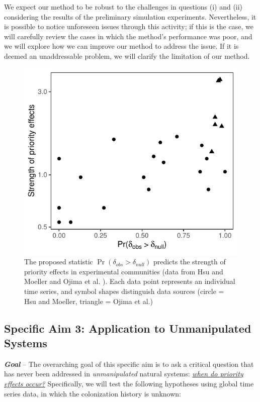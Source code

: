 \documentclass[12pt, class=article, crop=false]{standalone}
\begin{document}
We expect our method to be robust to the challenges in questions (i) and (ii) considering the results of the preliminary simulation experiments.
Nevertheless, it is possible to notice unforeseen issues through this activity; if this is the case, we will carefully review the cases in which the method's performance was poor, and we will explore how we can improve our method to address the issue.
If it is deemed an unaddressable problem, we will clarify the limitation of our method.

\begin{figure}
    \includegraphics[scale=0.7]{output/figure_exp.pdf}
    \caption{The proposed statistic $\Pr({\delta_{obs} > \delta_{null}})$ predicts the strength of priority effects in experimental communities (data from Hsu and Moeller \citep{hsu_metabolic_2021} and Ojima et al. \citep{ojima_priority_2022}).
    Each data point represents an individual time series, and symbol shapes distinguish data sources (circle = Hsu and Moeller, triangle = Ojima et al.)}
    \label{fig:experiment}
\end{figure}

\subsection*{Specific Aim 3: Application to Unmanipulated Systems}

\textbf{\textit{Goal}} -- 
The overarching goal of this specific aim is to ask a critical question that has never been addressed in \textit{unmanipulated} natural systems: \ul{\textit{when do priority effects occur?}} Specifically, we will test the following hypotheses using global time series data, in which the colonization history is unknown:
\end{document}
